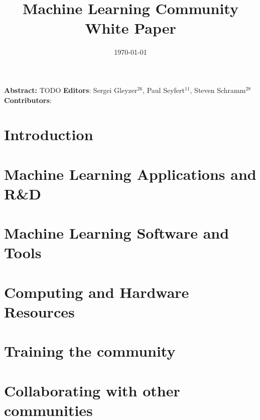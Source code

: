 \documentclass{article}
\title{Machine Learning Community White Paper}
\date{\today}
\begin{document}
\normalsize



\clearpage


\maketitle

\setlength\parindent{0pt}
\textbf{Abstract:} TODO
\vskip 1cm
\textbf{Editors}: Sergei Gleyzer$^{26}$, Paul Seyfert$^{11}$, Steven Schramm$^{28}$\\
\newline
\textbf{Contributors}:


\tableofcontents
\clearpage

\section{Introduction}
\label{sec:introduction}


\section{Machine Learning Applications and R\&D}
\label{sec:applications}


\section{Machine Learning Software and Tools}
\label{sec:software}


%

\section{Computing and Hardware Resources}
\label{sec:resources}


\section{Training the community}
\label{sec:training}


\section{Collaborating with other communities}
\label{sec:collaboration}

\end{document}
